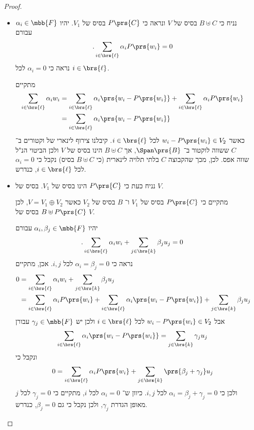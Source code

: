 \documentclass[a4paper,10pt,twoside,openany]{article}
\begin{document}
\begin{proof}
\begin{itemize}
\item נניח כי
$B \uplus C$
בסיס  של
$V$
ונראה כי
$P\prs{C}$
בסיס של
$V_1$.
יהיו
$\alpha_i \in \mbb{F}$
עבורם
\[\text{.} \sum_{i \in \brs{\ell}} \alpha_i P\prs{w_i} = 0\]
נראה כי
$\alpha_i = 0$
לכל
$i \in \brs{\ell}$.

מתקיים
\begin{align*}
\sum_{i \in \brs{\ell}} \alpha_i w_i
&=
\sum_{i \in \brs{\ell}} \alpha_i \prs{w_i - P\prs{w_i}} + \sum_{i \in \brs{\ell}} \alpha_i P\prs{w_i}
\\&=
\sum_{i \in \brs{\ell}} \alpha_i \prs{w_i - P\prs{w_i}}
\end{align*}
כאשר
$w_i - P\prs{w_i} \in V_2$
לכל
$i \in \brs{\ell}$.
קיבלנו צירוף לינארי של וקטורים ב־%
$C$
ששווה לוקטור ב־%
$\Span\prs{B}$,
אך
$B \uplus C$
הינו בסיס של
$V$
ולכן הביטוי הנ"ל שווה אפס.
לכן, מכך שהקבוצה
$C$
בלתי תלויה לינארית (כי $B \uplus C$ בסיס) נקבל כי
$\alpha_i = 0$
לכל
$i \in \brs{\ell}$,
כנדרש.

\item נניח כעת כי
$P\prs{C}$
הינו בסיס של
$V_1$.
בסיס של
$V$.

מתקיים כי
$P\prs{C}$
בסיס של
$V_1$
ו־%
$B$
בסיס של
$V_2$
כאשר
$V = V_1 \oplus V_2$,
לכן
$B \uplus P\prs{C}$
בסיס של
$V$.

יהיו
$\alpha_i, \beta_j \in \mbb{F}$
עבורם
\[\text{.} \sum_{i \in \brs{\ell}} \alpha_i w_i + \sum_{j \in \brs{k}} \beta_j u_j = 0\]
נראה כי
$\alpha_i = \beta_j = 0$
לכל
$i,j$.
אכן, מתקיים
\begin{align*}
0 &= \sum_{i \in \brs{\ell}} \alpha_i w_i + \sum_{j \in \brs{k}} \beta_j u_j
\\&=
\sum_{i \in \brs{\ell}} \alpha_i P\prs{w_i} + \sum_{i \in \brs{\ell}} \alpha_i \prs{w_i - P\prs{w_i}} + \sum_{j \in \brs{k}} \beta_j u_j
\end{align*}
אבל
$w_i - P\prs{w_i} \in V_2$
לכל
$i \in \brs{\ell}$
ולכן יש
$\gamma_j \in \mbb{F}$
עבורן
\[\sum_{i \in \brs{\ell}} \alpha_i \prs{w_i - P\prs{w_i}} = \sum_{j \in \brs{k}} \gamma_j u_j\]
ונקבל כי
\[0 = \sum_{i \in \brs{\ell}} \alpha_i P\prs{w_i} + \sum_{j \in \brs{k}} \prs{\beta_j + \gamma_j} u_j\]
ולכן כי
$\alpha_i = \beta_j + \gamma_j = 0$
לכל
$i,j$.
כיוון ש־%
$\alpha_i = 0$
לכל
$i$,
מתקיים כי
$\gamma_j = 0$
לכל
$j$
מאופן הגדרת
$\gamma_j$,
ולכן נקבל כי גם
$\beta_j = 0$,
כנדרש.
\end{itemize}
\end{proof}
\end{document}
